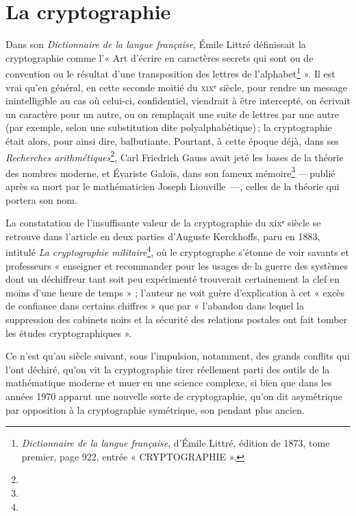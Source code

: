 
\section{La cryptographie} %
\label{sec:cryptographie}


Dans son \emph{Dictionnaire de la langue française}, Émile Littré définissait la cryptographie comme
l’« Art d'écrire en caractères secrets qui sont ou de convention ou le résultat d'une transposition
des lettres de l'alphabet\footnote{\emph{Dictionnaire de la langue française}, d’Émile Littré,
édition de 1873, tome premier, page 922, entrée « CRYPTOGRAPHIE ».} ».
Il est vrai qu’en général, en cette seconde moitié  du \textsc{xix}ᵉ siècle, pour rendre un message
inintelligible au cas où celui-ci, confidentiel, viendrait à être intercepté, on écrivait un
caractère pour un autre, ou on remplaçait une suite de lettres par une autre (par exemple, selon une
substitution dite polyalphabétique) ; la cryptographie était alors, pour ainsi dire, balbutiante.
Pourtant, à cette époque déjà, dans ses \emph{Recherches arithmétiques}\footnote{}, Carl Friedrich
Gauss avait jeté les bases de la théorie des nombres moderne, et Évariste Galois, dans son fameux
mémoire\footnote{} --- publié après sa mort par le mathématicien Joseph Liouville ---, celles de la
théorie qui portera son nom.

La constatation de l’insuffisante valeur de la cryptographie du {\sc xix}ᵉ siècle se retrouve dans
l’article en deux parties d’Auguste Kerckhoffs, paru en 1883, intitulé \emph{La cryptographie
militaire}\footnote{}, où le cryptographe s’étonne de voir savants et professeurs « enseigner et
recommander pour les usages de la guerre des systèmes dont un déchiffreur tant soit peu expérimenté
trouverait certainement la clef en moins d’une heure de temps » ; l’auteur ne voit guère
d’explication à cet « excès de confiance dans certains chiffres » que par « l’abandon dans lequel la
suppression des cabinets noirs et la sécurité des relations postales ont fait tomber les études
cryptographiques ».

Ce n’est qu’au siècle suivant, sous l’impulsion, notamment, des grands conflits qui l’ont déchiré,
qu’on vit la cryptographie tirer réellement parti des outils de la mathématique moderne et muer en
une science complexe, si bien que dans les années 1970 apparut une nouvelle sorte de cryptographie,
qu’on dit asymétrique par opposition à la cryptographie symétrique, son pendant plus ancien.

